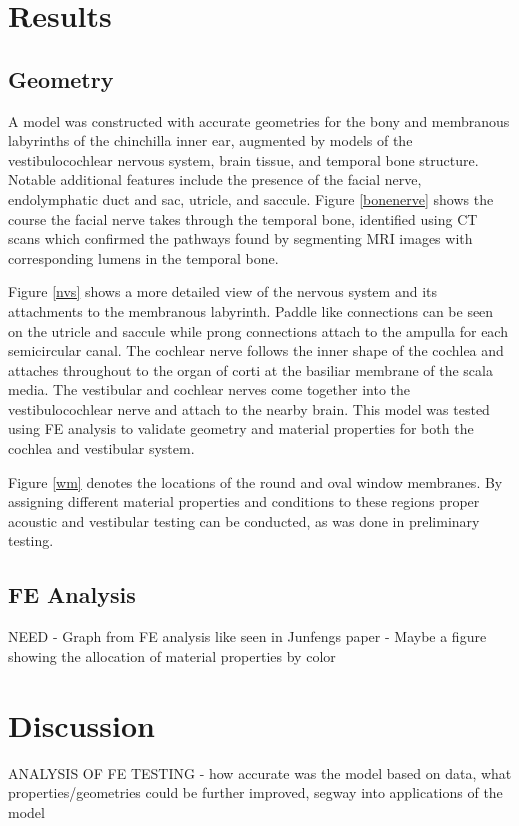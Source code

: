 \documentclass[12pt]{article}
\begin{document}
\section{Results}
\subsection{Geometry}
A model was constructed with accurate geometries for the bony and membranous labyrinths of the chinchilla inner ear, augmented by models of the vestibulocochlear nervous system, brain tissue, and temporal bone structure. Notable additional features include the presence of the facial nerve, endolymphatic duct and sac, utricle, and saccule. Figure \ref{bonenerve} shows the course the facial nerve takes through the temporal bone, identified using CT scans which confirmed the pathways found by segmenting MRI images with corresponding lumens in the temporal bone.



Figure \ref{nvs} shows a more detailed view of the nervous system and its attachments to the membranous labyrinth. Paddle like connections can be seen on the utricle and saccule while prong connections attach to the ampulla for each semicircular canal. The cochlear nerve follows the inner shape of the cochlea and attaches throughout to the organ of corti at the basiliar membrane of the scala media. The vestibular and cochlear nerves come together into the vestibulocochlear nerve and attach to the nearby brain.
This model was tested using FE analysis to validate geometry and material properties for both the cochlea and vestibular system.



Figure \ref{wm} denotes the locations of the round and oval window membranes. By assigning different material properties and conditions to these regions proper acoustic and vestibular testing can be conducted, as was done in preliminary testing.



\subsection{FE Analysis}
NEED \newline - Graph from FE analysis like seen in Junfengs paper
- Maybe a figure showing the allocation of material properties by color



\section{Discussion}\label{discussion}
ANALYSIS OF FE TESTING - how accurate was the model based on data, what properties/geometries could be further improved, segway into applications of the model
\end{document}
